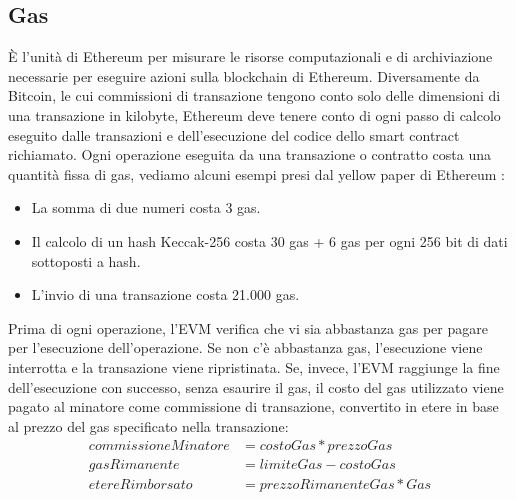 \subsection*{Gas}
È l'unità di Ethereum per misurare le risorse computazionali e di archiviazione necessarie per eseguire azioni sulla blockchain di Ethereum. Diversamente da Bitcoin, le cui commissioni di transazione tengono conto solo delle dimensioni di una transazione in kilobyte, Ethereum deve tenere conto di ogni passo di calcolo eseguito dalle transazioni e dell'esecuzione del codice dello smart contract richiamato. Ogni operazione eseguita da una transazione o contratto costa una quantità fissa di gas, vediamo alcuni esempi presi dal yellow paper di Ethereum \cite{yellow-paper-ethereum:gavin}:
\begin{itemize}
	\item La somma di due numeri costa 3 gas.
	\item Il calcolo di un hash Keccak-256 costa 30 gas + 6 gas per ogni 256 bit di dati sottoposti a hash.
	\item L'invio di una transazione costa 21.000 gas.
\end{itemize}
Prima di ogni operazione, l'EVM verifica che vi sia abbastanza gas per pagare per l'esecuzione dell'operazione. Se non c'è abbastanza gas, l'esecuzione viene interrotta e la transazione viene ripristinata. Se, invece, l'EVM raggiunge la fine dell'esecuzione con successo, senza esaurire il gas, il costo del gas utilizzato viene pagato al minatore come commissione di transazione, convertito in etere in base al prezzo del gas specificato nella transazione:
%
\begin{align*}
	commissione Minatore &= costo Gas * prezzo Gas\\
	gas Rimanente &= limite Gas - costo Gas\\
	etere Rimborsato &= prezzo Rimanente Gas * Gas 
\end{align*}


